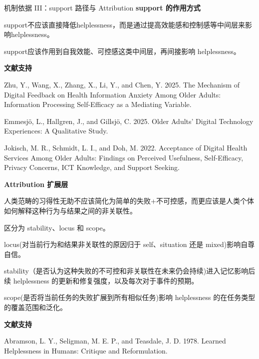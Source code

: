 \documentclass[aspectratio=169]{beamer}
\begin{document}
\begin{frame}[t]{机制依据 III：support 路径与 Attribution}
\tiny
\justifying
\textbf{support 的作用方式}

support不应该直接降低helplessness，而是通过提高效能感和控制感等中间层来影响helplessness。

support应该作用到自我效能、可控感这类中间层，再间接影响 helplessness。

\vspace{0.12cm}
\textbf{文献支持}

Zhu, Y., Wang, X., Zhang, X., Li, Y., and Chen, Y. 2025. The Mechanism of Digital Feedback on Health Information Anxiety Among Older Adults: Information Processing Self-Efficacy as a Mediating Variable.

Emmesjö, L., Hallgren, J., and Gillsjö, C. 2025. Older Adults' Digital Technology Experiences: A Qualitative Study.

Jokisch, M. R., Schmidt, L. I., and Doh, M. 2022. Acceptance of Digital Health Services Among Older Adults: Findings on Perceived Usefulness, Self-Efficacy, Privacy Concerns, ICT Knowledge, and Support Seeking.

\vspace{0.16cm}
\textbf{Attribution 扩展层}

人类范畴的习得性无助不应该简化为简单的失败+不可控感，而更应该是人类个体如何解释这种行为与结果之间的非关联性。

区分为 stability、locus 和 scope。

locus(对当前行为和结果非关联性的原因归于 self、situation 还是 mixed)影响自尊自信。

stability（是否认为这种失败的不可控和非关联性在未来仍会持续)进入记忆影响后续 helplessness 的更新和修复强度，以及每次对于事件的预期。

scope(是否将当前任务的失败扩展到所有相似任务)影响 helplessness 的在任务类型的覆盖范围和泛化。

\vspace{0.12cm}
\textbf{文献支持}

Abramson, L. Y., Seligman, M. E. P., and Teasdale, J. D. 1978. Learned Helplessness in Humans: Critique and Reformulation.
\end{frame}
\end{document}
